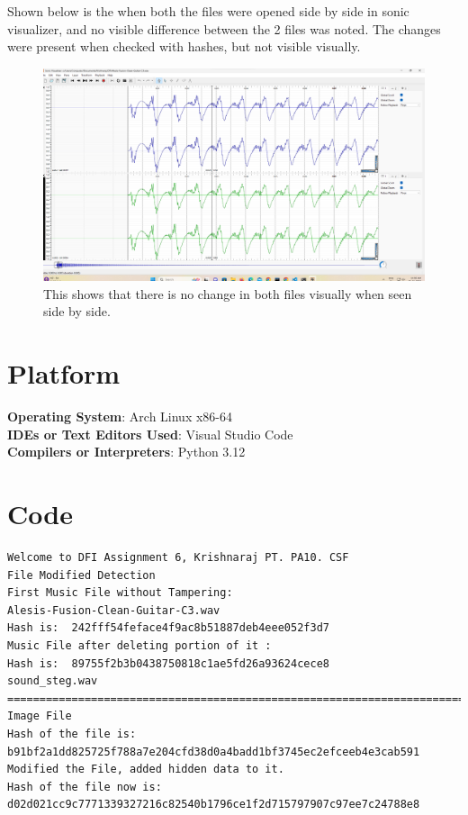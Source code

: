 \documentclass[11pt]{article}
\begin{document}
Shown below is the when both the files were opened side by side in sonic visualizer, and no visible difference between the 2 files was noted. The changes were present when checked with hashes, but not visible visually. 

\begin{figure}[H]
    \centering
    \includegraphics[width=.95\textwidth]{no change in sonic.png}
    \caption{This shows that there is no change in both files visually when seen side by side. }
\end{figure}

\section{Platform}
\textbf{Operating System}: Arch Linux x86-64 \\
\textbf{IDEs or Text Editors Used}: Visual Studio Code\\
\textbf{Compilers or Interpreters}: Python 3.12\\

\section{Code}


\begin{lstlisting}[language=bash, caption={Output}]
Welcome to DFI Assignment 6, Krishnaraj PT. PA10. CSF
File Modified Detection
First Music File without Tampering: 
Alesis-Fusion-Clean-Guitar-C3.wav
Hash is:  242fff54feface4f9ac8b51887deb4eee052f3d7
Music File after deleting portion of it : 
Hash is:  89755f2b3b0438750818c1ae5fd26a93624cece8
sound_steg.wav
====================================================================================
Image File
Hash of the file is: 
b91bf2a1dd825725f788a7e204cfd38d0a4badd1bf3745ec2efceeb4e3cab591
Modified the File, added hidden data to it.
Hash of the file now is:
d02d021cc9c7771339327216c82540b1796ce1f2d715797907c97ee7c24788e8
\end{lstlisting}
\end{document}
